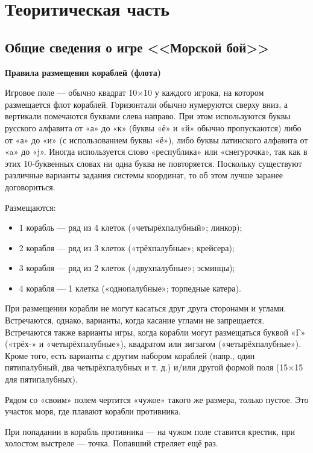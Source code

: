 \chapter{\label{ch:ch01}Теоритическая часть} %
\section{\label{sec:ch01/sec01}Общие сведения о игре <<Морской бой>>}
\textbf{Правила размещения кораблей (флота)}

Игровое поле — обычно квадрат 10×10 у каждого игрока, на котором размещается флот кораблей. Горизонтали обычно нумеруются сверху вниз, а вертикали помечаются буквами слева направо. При этом используются буквы русского алфавита от «а» до «к» (буквы «ё» и «й» обычно пропускаются) либо от «а» до «и» (с использованием буквы «ё»), либо буквы латинского алфавита от «a» до «j». Иногда используется слово «республика» или «снегурочка», так как в этих 10-буквенных словах ни одна буква не повторяется. Поскольку существуют различные варианты задания системы координат, то об этом лучше заранее договориться.

Размещаются:
\begin{itemize}
\item 1 корабль — ряд из 4 клеток («четырёхпалубный»; линкор);
\item 2 корабля — ряд из 3 клеток («трёхпалубные»; крейсера);
\item 3 корабля — ряд из 2 клеток («двухпалубные»; эсминцы);
\item 4 корабля — 1 клетка («однопалубные»; торпедные катера).
\end{itemize}

При размещении корабли не могут касаться друг друга сторонами и углами. Встречаются, однако, варианты, когда касание углами не запрещается. Встречаются также варианты игры, когда корабли могут размещаться буквой «Г» («трёх-» и «четырёхпалубные»), квадратом или зигзагом («четырёхпалубные»). Кроме того, есть варианты с другим набором кораблей (напр., один пятипалубный, два четырёхпалубных и т. д.) и/или другой формой поля (15×15 для пятипалубных).

Рядом со «своим» полем чертится «чужое» такого же размера, только пустое. Это участок моря, где плавают корабли противника.

При попадании в корабль противника — на чужом поле ставится крестик, при холостом выстреле — точка. Попавший стреляет ещё раз.

